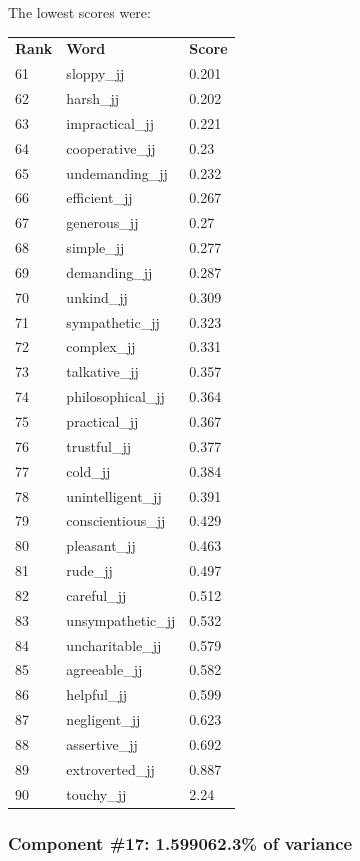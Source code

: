 \documentclass[10pt,letterpaper]{book}
\begin{document}
The lowest scores were:
\begin{tabular}{ l l l }
        \textbf{Rank} & \textbf{Word} & \textbf{Score} \\
        61 & sloppy\_jj & 0.201 \\
        62 & harsh\_jj & 0.202 \\
        63 & impractical\_jj & 0.221 \\
        64 & cooperative\_jj & 0.23 \\
        65 & undemanding\_jj & 0.232 \\
        66 & efficient\_jj & 0.267 \\
        67 & generous\_jj & 0.27 \\
        68 & simple\_jj & 0.277 \\
        69 & demanding\_jj & 0.287 \\
        70 & unkind\_jj & 0.309 \\
        71 & sympathetic\_jj & 0.323 \\
        72 & complex\_jj & 0.331 \\
        73 & talkative\_jj & 0.357 \\
        74 & philosophical\_jj & 0.364 \\
        75 & practical\_jj & 0.367 \\
        76 & trustful\_jj & 0.377 \\
        77 & cold\_jj & 0.384 \\
        78 & unintelligent\_jj & 0.391 \\
        79 & conscientious\_jj & 0.429 \\
        80 & pleasant\_jj & 0.463 \\
        81 & rude\_jj & 0.497 \\
        82 & careful\_jj & 0.512 \\
        83 & unsympathetic\_jj & 0.532 \\
        84 & uncharitable\_jj & 0.579 \\
        85 & agreeable\_jj & 0.582 \\
        86 & helpful\_jj & 0.599 \\
        87 & negligent\_jj & 0.623 \\
        88 & assertive\_jj & 0.692 \\
        89 & extroverted\_jj & 0.887 \\
        90 & touchy\_jj & 2.24 \\
\end{tabular}
\subsubsection{Component \#17: 1.599062.3\% of variance}
\end{document}
